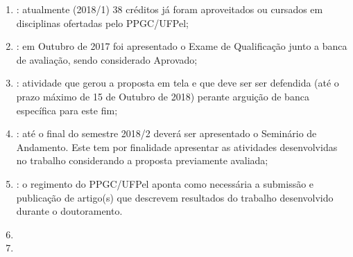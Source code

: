 \documentclass[tese-proposta,nocipinfo]{texufpel}
\begin{document}
\begin{enumerate} %
	\item {}: atualmente (2018/1) 38 créditos já foram aproveitados ou cursados em disciplinas ofertadas pelo PPGC/UFPel;
    \item {}: em Outubro de 2017 foi apresentado o Exame de Qualificação junto a banca de avaliação, sendo considerado Aprovado;
    \item {}: atividade que gerou a proposta em tela e que deve ser ser defendida (até o prazo máximo de 15 de Outubro de 2018) perante arguição de banca específica para este fim;
    \item {}: até o final do semestre 2018/2 deverá ser apresentado o Seminário de Andamento. Este tem por finalidade apresentar as atividades desenvolvidas no trabalho considerando a proposta previamente avaliada;
    \item {}: o regimento do PPGC/UFPel aponta como necessária a submissão e publicação de artigo(s) que descrevem resultados do trabalho desenvolvido durante o doutoramento.
    \item {}
    \item {}
\end{enumerate}



\end{document}
